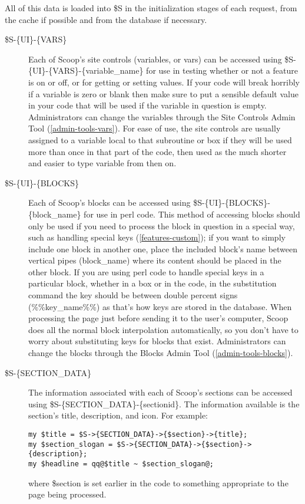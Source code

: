 All of this data is loaded into \$S in the initialization stages of each request, from the cache if possible and from the database if necessary.

\begin{description}
\item[\$S-\latexhtml{$>$}{>}\{UI\}-\latexhtml{$>$}{>}\{VARS\}] Each of Scoop's site controls (variables, or vars) can be accessed using \$S-\latexhtml{$>$}{>}\{UI\}-\latexhtml{$>$}{>}\{VARS\}-\latexhtml{$>$}{>}\{variable\_name\} for use in testing whether or not a feature is on or off, or for getting or setting values. If your code will break horribly if a variable is zero or blank then make sure to put a sensible default value in your code that will be used if the variable in question is empty. Administrators can change the variables through the Site Controls Admin Tool (\ref{admin-tools-vars}). For ease of use, the site controls are usually assigned to a variable local to that subroutine or box if they will be used more than once in that part of the code, then used as the much shorter and easier to type variable from then on.

\item[\$S-\latexhtml{$>$}{>}\{UI\}-\latexhtml{$>$}{>}\{BLOCKS\}] Each of Scoop's blocks can be accessed using \$S-\latexhtml{$>$}{>}\{UI\}-\latexhtml{$>$}{>}\{BLOCKS\}-\latexhtml{$>$}{>}\{block\_name\} for use in perl code. This method of accessing blocks should only be used if you need to process the block in question in a special way, such as handling special keys (\ref{features-custom}); if you want to simply include one block in another one, place the included block's name between vertical pipes (\latexhtml{$\vert$}{|}block\_name\latexhtml{$\vert$}{|}) where its content should be placed in the other block. If you are using perl code to handle special keys in a particular block, whether in a box or in the code, in the substitution command the key should be between double percent signs (\%\%key\_name\%\%) as that's how keys are stored in the database. When processing the page just before sending it to the user's computer, Scoop does all the normal block interpolation automatically, so you don't have to worry about substituting keys for blocks that exist. Administrators can change the blocks through the Blocks Admin Tool (\ref{admin-tools-blocks}).

\item[\$S-\latexhtml{$>$}{>}\{SECTION\_DATA\}] The information associated with each of Scoop's sections can be accessed using \$S-\latexhtml{$>$}{>}\{SECTION\_DATA\}-\latexhtml{$>$}{>}\{sectionid\}. The information available is the section's title, description, and icon. For example:
\begin{verbatim}
my $title = $S->{SECTION_DATA}->{$section}->{title};
my $section_slogan = $S->{SECTION_DATA}->{$section}->{description};
my $headline = qq@$title ~ $section_slogan@;
\end{verbatim}
where \$section is set earlier in the code to something appropriate to the page being processed.


\end{description}

